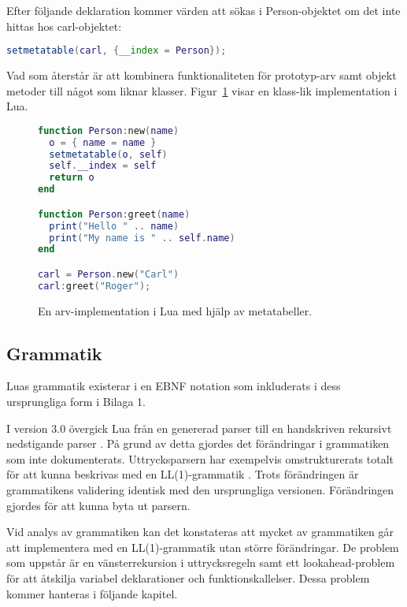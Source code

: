 Efter följande deklaration kommer värden att sökas i Person-objektet om det
inte hittas hos carl-objektet:
\\

\begin{lstlisting}[language=Lua]
setmetatable(carl, {__index = Person});
\end{lstlisting}
\vspace{-2em}
Vad som återstår är att kombinera funktionaliteten för prototyp-arv samt
objekt metoder till något som liknar klasser. Figur~\ref{fig:class} visar en
klass-lik implementation i Lua.

\begin{figure}[ht]
  \begin{lstlisting}[language=Lua]
function Person:new(name)
  o = { name = name }
  setmetatable(o, self)
  self.__index = self
  return o
end

function Person:greet(name)
  print("Hello " .. name)
  print("My name is " .. self.name)
end

carl = Person.new("Carl")
carl:greet("Roger");
  \end{lstlisting}
  \caption{En arv-implementation i Lua med hjälp av metatabeller.}
  \label{fig:class}
\end{figure}

\subsection{Grammatik}

Luas grammatik existerar i en EBNF notation som inkluderats i dess
ursprungliga form i Bilaga 1.

I version 3.0 övergick Lua från en genererad parser till en handskriven
rekursivt nedstigande parser \citep{luaimp}. På grund av detta gjordes det
förändringar i grammatiken som inte dokumenterats. Uttrycksparsern har
exempelvis omstrukturerats totalt för att kunna beskrivas med en
LL(1)-grammatik \citep[s. 175]{bf09}. Trots förändringen är grammatikens
validering identisk med den ursprungliga versionen. Förändringen gjordes för
att kunna byta ut parsern.

Vid analys av grammatiken kan det konstateras att mycket av grammatiken går att
implementera med en LL(1)-grammatik utan större förändringar. De problem som
uppstår är en vänsterrekursion i uttrycksregeln samt ett lookahead-problem för
att åtskilja variabel deklarationer och funktionskallelser. Dessa problem
kommer hanteras i följande kapitel.

